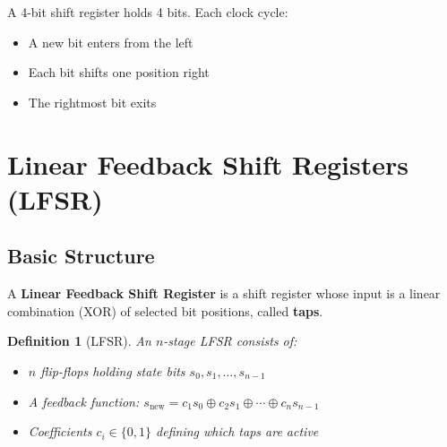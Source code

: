\documentclass[11pt]{article}
\newtheorem{definition}{Definition}
\begin{document}
A 4-bit shift register holds 4 bits. Each clock cycle:
\begin{itemize}
    \item A new bit enters from the left
    \item Each bit shifts one position right
    \item The rightmost bit exits
\end{itemize}

\section{Linear Feedback Shift Registers (LFSR)}

\subsection{Basic Structure}

A \textbf{Linear Feedback Shift Register} is a shift register whose input is a linear combination (XOR) of selected bit positions, called \textbf{taps}.

\begin{definition}[LFSR]
An $n$-stage LFSR consists of:
\begin{itemize}
    \item $n$ flip-flops holding state bits $s_0, s_1, \ldots, s_{n-1}$
    \item A feedback function: $s_{\text{new}} = c_1 s_0 \oplus c_2 s_1 \oplus \cdots \oplus c_n s_{n-1}$
    \item Coefficients $c_i \in \{0, 1\}$ defining which taps are active
\end{itemize}
\end{definition}

\begin{center}
\end{center}
\end{document}
